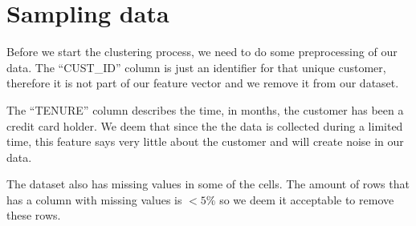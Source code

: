 \section{Sampling data}

Before we start the clustering process, we need to do some preprocessing of our data. The ``CUST\_ID'' column is just an identifier for that unique customer, therefore it is not part of our feature vector and we remove it from our dataset. 
\par
The ``TENURE'' column describes the time, in months, the customer has been a credit card holder. We deem that since the the data is collected during a limited time, this feature says very little about the customer and will create noise in our data.
\par
The dataset also has missing values in some of the cells. The amount of rows that has a column with missing values is $< 5\%$ so we deem it acceptable to remove these rows.